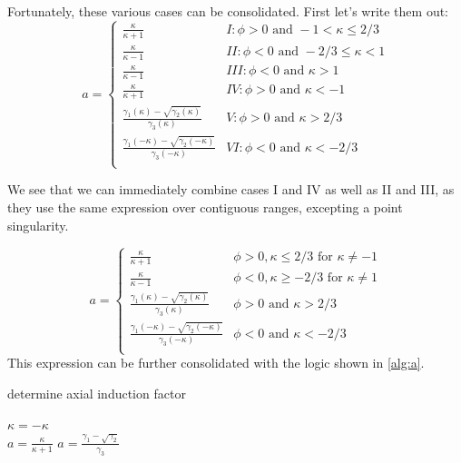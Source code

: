 \documentclass{article}
\begin{document}
Fortunately, these various cases can be consolidated.  First let's write them out:
\begin{equation}
    a =
    \begin{cases}
        \frac{\kappa}{\kappa + 1} & I: \phi > 0 \text{ and } -1 < \kappa \le 2/3 \\
        \frac{\kappa}{\kappa - 1} & II: \phi < 0 \text{ and } -2/3 \le \kappa < 1 \\
        \frac{\kappa}{\kappa - 1} & III: \phi < 0 \text{ and } \kappa > 1 \\
        \frac{\kappa}{\kappa + 1} & IV: \phi > 0 \text{ and } \kappa < -1 \\
        \frac{\gamma_1(\kappa) - \sqrt{\gamma_2(\kappa)}}{\gamma_3(\kappa)} & V: \phi > 0 \text{ and } \kappa > 2/3 \\
        \frac{\gamma_1(-\kappa) - \sqrt{\gamma_2(-\kappa)}}{\gamma_3(-\kappa)} & VI: \phi < 0 \text{ and } \kappa < -2/3 \\
    \end{cases}
\end{equation}

We see that we can immediately combine cases I and IV as well as II and III, as they use the same expression over contiguous ranges, excepting a point singularity.

\begin{equation}
    a =
    \begin{cases}
        \frac{\kappa}{\kappa + 1} & \phi > 0, \kappa \le 2/3 \text{ for } \kappa \ne -1\\
        \frac{\kappa}{\kappa - 1} & \phi < 0, \kappa \ge -2/3 \text{ for } \kappa \ne 1\\
        \frac{\gamma_1(\kappa) - \sqrt{\gamma_2(\kappa)}}{\gamma_3(\kappa)} & \phi > 0 \text{ and } \kappa > 2/3 \\
        \frac{\gamma_1(-\kappa) - \sqrt{\gamma_2(-\kappa)}}{\gamma_3(-\kappa)} & \phi < 0 \text{ and } \kappa < -2/3 \\
    \end{cases}
    \label{eq:asing}
\end{equation}
This expression can be further consolidated with the logic shown in \cref{alg:a}.
\begin{algorithm}[htbp]
\caption{determine axial induction factor}
\begin{algorithmic}

    \State $\kappa = -\kappa$
\EndIf
\\
    \State $a = \frac{\kappa}{\kappa + 1}$
\Else
    \State $a = \frac{\gamma_1 - \sqrt{\gamma_2}}{\gamma_3}$
\EndIf

\end{algorithmic}
\label{alg:a}
\end{algorithm}
\end{document}
